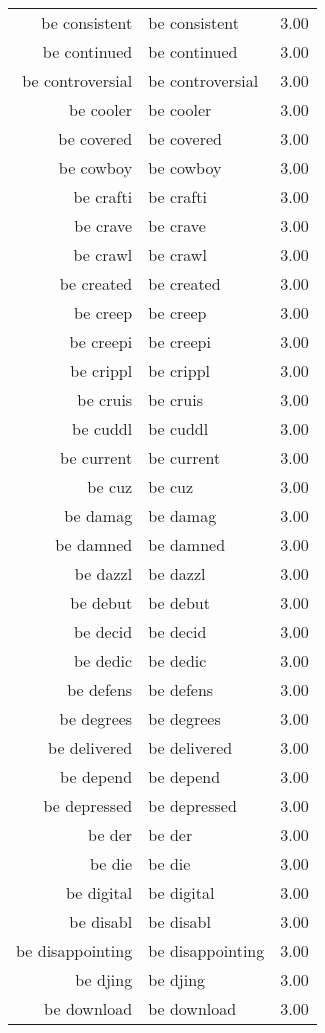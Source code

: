 \begin{table}[ht]
\begin{tabular}{rlr}
  be consistent & be consistent & 3.00 \\ 
  be continued & be continued & 3.00 \\ 
  be controversial & be controversial & 3.00 \\ 
  be cooler & be cooler & 3.00 \\ 
  be covered & be covered & 3.00 \\ 
  be cowboy & be cowboy & 3.00 \\ 
  be crafti & be crafti & 3.00 \\ 
  be crave & be crave & 3.00 \\ 
  be crawl & be crawl & 3.00 \\ 
  be created & be created & 3.00 \\ 
  be creep & be creep & 3.00 \\ 
  be creepi & be creepi & 3.00 \\ 
  be crippl & be crippl & 3.00 \\ 
  be cruis & be cruis & 3.00 \\ 
  be cuddl & be cuddl & 3.00 \\ 
  be current & be current & 3.00 \\ 
  be cuz & be cuz & 3.00 \\ 
  be damag & be damag & 3.00 \\ 
  be damned & be damned & 3.00 \\ 
  be dazzl & be dazzl & 3.00 \\ 
  be debut & be debut & 3.00 \\ 
  be decid & be decid & 3.00 \\ 
  be dedic & be dedic & 3.00 \\ 
  be defens & be defens & 3.00 \\ 
  be degrees & be degrees & 3.00 \\ 
  be delivered & be delivered & 3.00 \\ 
  be depend & be depend & 3.00 \\ 
  be depressed & be depressed & 3.00 \\ 
  be der & be der & 3.00 \\ 
  be die & be die & 3.00 \\ 
  be digital & be digital & 3.00 \\ 
  be disabl & be disabl & 3.00 \\ 
  be disappointing & be disappointing & 3.00 \\ 
  be djing & be djing & 3.00 \\ 
  be download & be download & 3.00 \\ 

\end{tabular}
\end{table}
